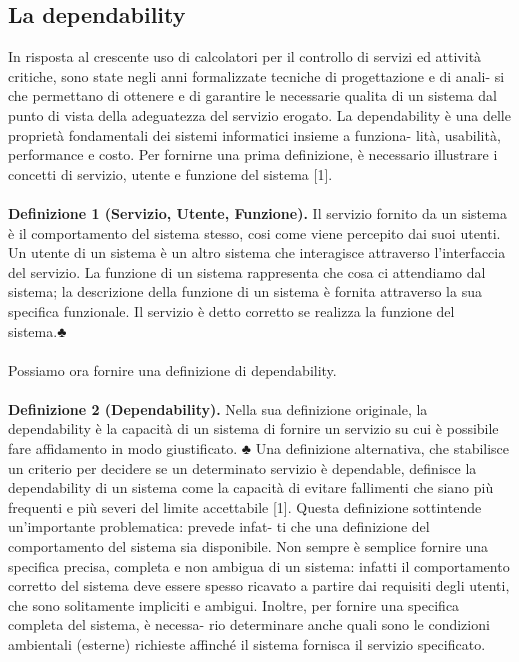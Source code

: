 \documentclass[14pt]{extarticle}
\begin{document}
\subsection{La dependability}
In risposta al crescente uso di calcolatori per il controllo di servizi ed attività
critiche, sono state negli anni formalizzate tecniche di progettazione e di anali-
si che permettano di ottenere e di garantire le necessarie qualita di un sistema
dal punto di vista della adeguatezza del servizio erogato. La dependability è
una delle proprietà fondamentali dei sistemi informatici insieme a funziona-
lità, usabilità, performance e costo. Per fornirne una prima definizione, è
necessario illustrare i concetti di servizio, utente e funzione del sistema [1].\\\\
\textbf{Definizione 1 (Servizio, Utente, Funzione).}  Il servizio fornito da un sistema è il comportamento del sistema stesso, cosi come viene percepito dai suoi utenti.
Un utente di un sistema è un altro sistema che interagisce attraverso l’interfaccia del
servizio. La funzione di un sistema rappresenta che cosa ci attendiamo dal sistema; la
descrizione della funzione di un sistema è fornita attraverso la sua specifica funzionale.
Il servizio è detto corretto se realizza la funzione del sistema.♣\\\\
Possiamo ora fornire una definizione di dependability.\\\\
\textbf{Definizione 2 (Dependability).} Nella sua definizione originale, la dependability è
la capacità di un sistema di fornire un servizio su cui è possibile fare affidamento in
modo giustificato.
♣
Una definizione alternativa, che stabilisce un criterio per decidere se un
determinato servizio è dependable, definisce la dependability di un sistema
come la capacità di evitare fallimenti che siano più frequenti e più severi del
limite accettabile [1].
Questa definizione sottintende un’importante problematica: prevede infat-
ti che una definizione del comportamento del sistema sia disponibile. Non
sempre è semplice fornire una specifica precisa, completa e non ambigua di
un sistema: infatti il comportamento corretto del sistema deve essere spesso
ricavato a partire dai requisiti degli utenti, che sono solitamente impliciti e
ambigui. Inoltre, per fornire una specifica completa del sistema, è necessa-
rio determinare anche quali sono le condizioni ambientali (esterne) richieste
affinché il sistema fornisca il servizio specificato.
\end{document}
